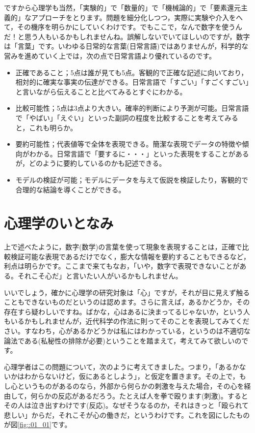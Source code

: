 \documentclass{book}
\begin{document}
ですから心理学も当然，「実験的」で「数量的」で「機械論的」で「要素還元主義的」なアプローチをとります。問題を細分化しつつ，実際に実験や介入をへて，その機序を明らかにしていくわけです。でもここで，なんで数字を使うんだ！と思う人もいるかもしれませんね。誤解しないでいてほしいのですが，数字は「言葉」です。いわゆる日常的な言葉(日常言語)ではありませんが，科学的な営みを進めていく上では，次の点で日常言語より優れているのです。

\begin{itemize}
	\item 正確であること；5点は誰が見ても5点。客観的で正確な記述に向いており，相対的に確実な事実の伝達ができる。日常言語で「すごい」「すごくすごい」と言いながら伝えることと比べてみるとすぐにわかる。
	\item 比較可能性；5点は3点より大きい。確率的判断により予測が可能。日常言語で「やばい」「えぐい」といった副詞の程度を比較することを考えてみると，これも明らか。
	\item 要約可能性；代表値等で全体を表現できる。簡潔な表現でデータの特徴や傾向がわかる。日常言語で「要するに・・・」といった表現をすることがあるが，どのように要約しているのかも記述できる。
	\item モデルの検証が可能；モデルにデータを与えて仮説を検証したり，客観的で合理的な結論を導くことができる。
\end{itemize}

\section{心理学のいとなみ}

上で述べたように，数字(数学)の言葉を使って現象を表現することは，正確で比較検証可能な表現であるだけでなく，膨大な情報を要約することもできるなど，利点は明らかです。ここまで来てもなお，「いや，数字で表現できないことがある。それこそ心だ」と言いたい人がいるかもしれません。

いいでしょう，確かに心理学の研究対象は「心」ですが，それが目に見えず触ることもできないものだというのは認めます。さらに言えば，あるかどうか，その存在すら疑わしいですね。ばかな，心はあるに決まってるじゃないか，という人もいるかもしれませんが，近代科学の作法に則ってそのことを表現してみてください。すなわち，心があるかどうかは私にはわかっている，というのは不適切な論法である(私秘性の排除が必要)ということを踏まえて，考えてみて欲しいのです。

心理学者はこの問題について，次のように考えてきました。つまり，「あるかないかはわからないけど，仮にあるとしよう」，と仮定を置きます。その上で，もし心というものがあるのなら，外部から何らかの刺激を与えた場合，その心を経由して，何らかの反応があるだろう。たとえば人を拳で殴ります(刺激)。するとその人は泣き出すわけです(反応)。なぜそうなるのか，それはきっと「殴られて悲しい」からだ，それこそが心の働きだ，というわけです。これを図にしたものが図\ref{fig::01_01}です。
\end{document}
